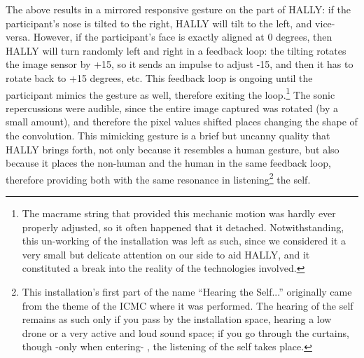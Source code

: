 \documentclass{nime-alternate}
\begin{document}
The above results in a mirrored responsive gesture on the part of HALLY: if the participant's nose is tilted to the right, HALLY will tilt to the left, and vice-versa. However, if the participant's face is exactly aligned at 0 degrees, then HALLY will turn randomly left and right in a feedback loop: the tilting rotates the image sensor by +15, so it sends an impulse to adjust -15, and then it has to rotate back to +15 degrees, etc. This feedback loop is ongoing until the participant mimics the gesture as well, therefore exiting the loop.\footnote{The macrame string that provided this mechanic motion was hardly ever properly adjusted, so it often happened that it detached. Notwithstanding, this un-working of the installation was left as such, since we considered it a very small but delicate attention on our side to aid HALLY, and it constituted a break into the reality of the technologies involved. } The sonic repercussions were audible, since the entire image captured was rotated (by a small amount), and therefore the pixel values shifted places changing the shape of the convolution. This mimicking gesture is a brief but uncanny quality that HALLY brings forth, not only because it resembles a human gesture, but also because it places the non-human and the human in the same feedback loop, therefore providing both with the same resonance in listening\footnote{This installation's first part of the name ``Hearing the Self...'' originally came from the theme of the ICMC where it was performed. The hearing of the self remains as such only if you pass by the installation space, hearing a low drone or a very active and loud sound space; if you go through the curtains, though -only when entering- , the listening of the self takes place.} the self.
\end{document}
